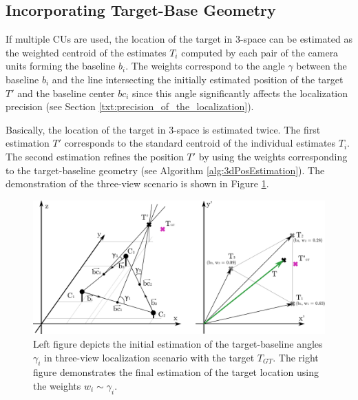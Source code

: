 \subsection{Incorporating Target-Base Geometry} \label{txt:incorporating_target-base_geometry}

If multiple CUs are used, the location of the target in 3-space can be estimated as the weighted centroid of the estimates $T_{i}$ computed by each pair of the camera units forming the baseline $b_{i}$. The weights correspond to the angle $\gamma$ between the baseline $b_{i}$ and the line intersecting the initially estimated position of the target $T'$ and the baseline center $bc_{i}$ since this angle significantly affects the localization precision (see Section \ref{txt:precision_of_the_localization}).

Basically, the location of the target in 3-space is estimated twice. The first estimation $T'$ corresponds to the standard centroid of the individual estimates $T_{i}$. The second estimation refines the position $T'$ by using the weights corresponding to the target-baseline geometry (see Algorithm \ref{alg:3dPosEstimation}). The demonstration of the three-view scenario is shown in Figure \ref{fig:target-base_and_weighted_centroid}.

\begin{figure}[htb]\centering
	\centering
	\includegraphics[width=0.8\linewidth]{fig/target-base_and_weighted_centroid.pdf}
	\caption{Left figure depicts the initial estimation of the target-baseline angles $\gamma_{i}$ in three-view localization scenario with the target $T_{GT}$. The right figure demonstrates the final estimation of the target location using the weights $w_{i} \sim \gamma_{i}$.}
	\label{fig:target-base_and_weighted_centroid}
\end{figure}

